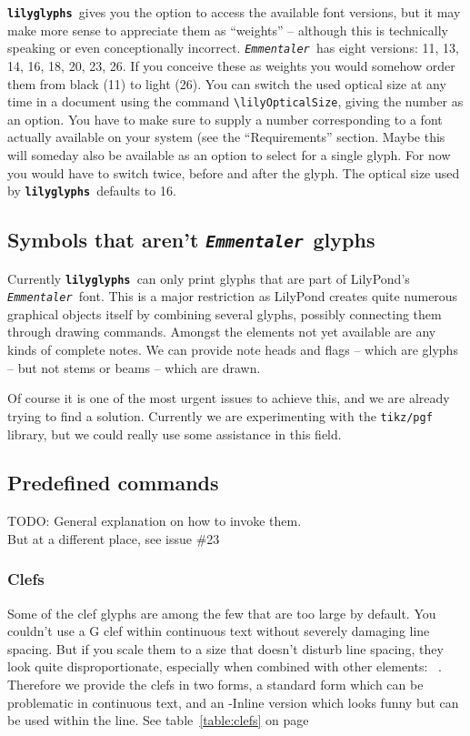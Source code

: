 \documentclass{article}
\newcommand*{\lilyglyphs}{\texttt{\textbf{lilyglyphs\,}}}
\newcommand*{\emmentaler}{\texttt{\textit{Emmentaler }}}
\newcommand*{\cmd}[1]{\texttt{\textbackslash #1}}
\begin{document}
\lilyglyphs gives you the option to access the available font versions, but it may make more sense to appreciate them as \enquote{weights} -- although this is technically speaking or even conceptionally incorrect.
\emmentaler has eight versions: 11, 13, 14, 16, 18, 20, 23, 26. 
If you conceive these as weights you would somehow order them from black (11) to light (26).
You can switch the used optical size at any time in a document using the command \cmd{lilyOpticalSize}, giving the number as an option. 
You have to make sure to supply a number corresponding to a font actually available on your system (see the \enquote{Requirements} section.
Maybe this will someday also be available as an option to select for a single glyph.
For now you would have to switch twice, before and after the glyph.
The optical size used by \lilyglyphs defaults to 16.

\subsection{Symbols that aren't \emmentaler glyphs}
Currently \lilyglyphs can only print glyphs that are part of LilyPond's \emmentaler font. 
This is a major restriction as LilyPond creates quite numerous graphical objects itself by combining several glyphs, possibly connecting them through drawing commands.
Amongst the elements not yet available are any kinds of complete notes.
We can provide note heads and flags -- which are glyphs -- but not stems or beams -- which are drawn.

Of course it is one of the most urgent issues to achieve this, and we are already trying to find a solution. 
Currently we are experimenting with the \texttt{tikz/pgf} library, but we could really use some assistance in this field.

\subsection{Predefined commands}
{\color{red}TODO: General explanation on how to invoke them. \\
But at a different place, see issue \#23}

\subsubsection{Clefs}
Some of the clef glyphs are among the few that are too large by default. 
You couldn't use a G clef within continuous text without severely \clefG* damaging line spacing. 
But if you scale them to a size that doesn't disturb line spacing, they look quite disproportionate, especially when combined with other elements: \mbox{ \clefCInline* \natural.}
Therefore we provide the clefs in two forms, a standard form which can be problematic in continuous text, and an -Inline version which looks funny but can be used within the line.
See table~\ref{table:clefs} on page~\pageref{table:clefs}
\end{document}
